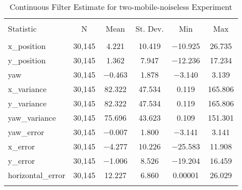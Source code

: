 
\begin{table}[h] \centering 
  \caption{Continuous Filter Estimate for two-mobile-noiseless Experiment} 
  \label{tab:two_mobile_noiseless_continuous_summary} 
\begin{tabular}{@{\extracolsep{5pt}}lccccc} 
\\[-1.8ex]\hline 
\hline \\[-1.8ex] 
Statistic & \multicolumn{1}{c}{N} & \multicolumn{1}{c}{Mean} & \multicolumn{1}{c}{St. Dev.} & \multicolumn{1}{c}{Min} & \multicolumn{1}{c}{Max} \\ 
\hline \\[-1.8ex] 
x\_position & 30,145 & 4.221 & 10.419 & $-$10.925 & 26.735 \\ 
y\_position & 30,145 & 1.362 & 7.947 & $-$12.236 & 17.234 \\ 
yaw & 30,145 & $-$0.463 & 1.878 & $-$3.140 & 3.139 \\ 
x\_variance & 30,145 & 82.322 & 47.534 & 0.119 & 165.806 \\ 
y\_variance & 30,145 & 82.322 & 47.534 & 0.119 & 165.806 \\ 
yaw\_variance & 30,145 & 75.696 & 43.623 & 0.109 & 151.301 \\ 
yaw\_error & 30,145 & $-$0.007 & 1.800 & $-$3.141 & 3.141 \\ 
x\_error & 30,145 & $-$4.277 & 10.226 & $-$25.583 & 11.908 \\ 
y\_error & 30,145 & $-$1.006 & 8.526 & $-$19.204 & 16.459 \\ 
horizontal\_error & 30,145 & 12.227 & 6.860 & 0.00001 & 26.029 \\ 
\hline \\[-1.8ex] 
\end{tabular} 
\end{table} 
